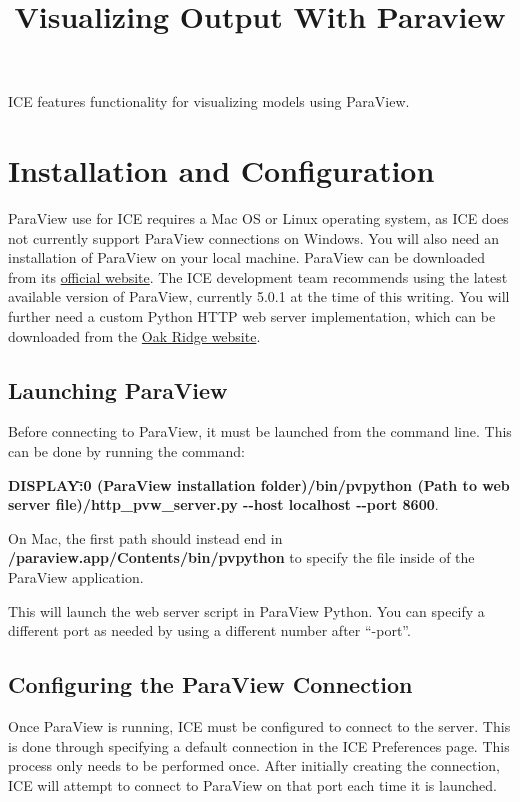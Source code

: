 \documentclass{article}
\begin{document}
\title{Visualizing Output With Paraview}

ICE features functionality for visualizing models using ParaView.

\section{Installation and Configuration}

ParaView use for ICE requires a Mac OS or Linux operating system, as ICE does
not currently support ParaView connections on Windows. You will also need an
installation of ParaView on your local machine. ParaView can be downloaded from
its \href{http://www.paraview.org/download/}{official website}. The ICE
development team recommends using the latest available version of ParaView,
currently 5.0.1 at the time of this writing. You will further need a custom
Python HTTP web server implementation, which can be downloaded from the
\href{http://eclipseice.ornl.gov/downloads/paraview/scripts/http_pvw_server.py}{Oak
Ridge website}.

\subsection{Launching ParaView}  

Before connecting to ParaView, it must be launched from the command line. This
can be done by running the command:

\textbf{DISPLAY\=:0 (ParaView installation folder)/bin/pvpython (Path to web
server file)/http\_pvw\_server.py -{}-host localhost -{}-port 8600}.

On Mac, the first path should instead end in \newline
\textbf{/paraview.app/Contents/bin/pvpython} to specify the file inside of the
ParaView application.

This will launch the web server script in ParaView Python. You can specify a
different port as needed by using a different number after ``-port''.

\subsection{Configuring the ParaView Connection}

Once ParaView is running, ICE must be configured to connect to the server. This
is done through specifying a default connection in the ICE Preferences page.
This process only needs to be performed once. After initially creating the
connection, ICE will attempt to connect to ParaView on that port each time it is
launched.
\end{document}
